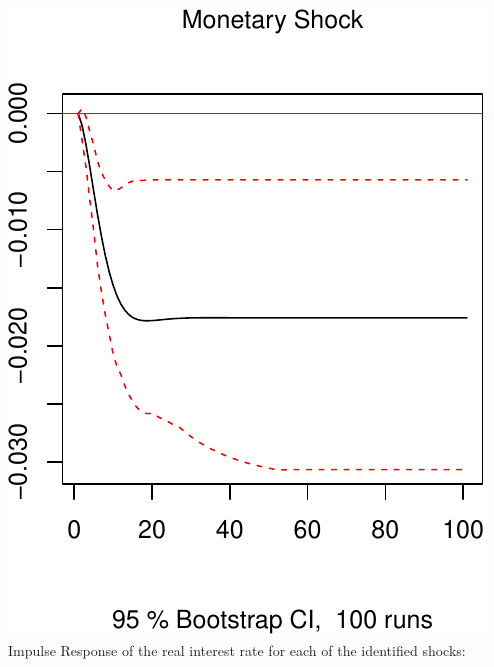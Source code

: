 \documentclass[11pt,preprint, authoryear]{elsarticle}
\numberwithin{equation}{section}
\numberwithin{figure}{section}
\numberwithin{table}{section}
\begin{document}
\includegraphics{TS_proj_files/figure-latex/unnamed-chunk-45-3.pdf}
\newpage Impulse Response of the real interest rate for each of the
identified shocks:
\end{document}
